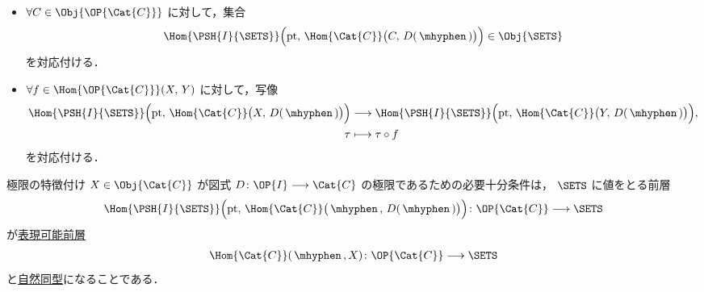 \documentclass[TQFT_main]{subfiles}
\begin{document}
\begin{itemize}
    \item $\forall C \in \Obj{\OP{\Cat{C}}}$ に対して，集合
    \begin{align}
        \Hom{\PSH{I}{\SETS}} \Bigl( \mathrm{pt},\, \Hom{\Cat{C}}\bigl(C,\, D(\, \mhyphen \,) \bigr)  \Bigr) \in \Obj{\SETS}
    \end{align}
    を対応付ける．
    \item $\forall f \in \Hom{\OP{\Cat{C}}} (X,\, Y)$ に対して，写像
    \begin{align}
        \Hom{\PSH{I}{\SETS}} \Bigl( \mathrm{pt},\, \Hom{\Cat{C}}\bigl(X,\, D(\, \mhyphen \,) \bigr)  \Bigr) &\lto \Hom{\PSH{I}{\SETS}} \Bigl( \mathrm{pt},\, \Hom{\Cat{C}}\bigl(Y,\, D(\, \mhyphen \,) \bigr)  \Bigr), \\
        \tau &\lmto \tau \circ f
    \end{align}
    を対応付ける．
\end{itemize}

\begin{myprop}[label=prop:redef-lim]{極限の特徴付け}
    $X \in \Obj{\Cat{C}}$ が図式 $D \colon \OP{I} \lto \Cat{C}$ の極限であるための必要十分条件は，
    $\SETS$ に値をとる前層
    \begin{align}
        \Hom{\PSH{I}{\SETS}} \Bigl( \mathrm{pt},\, \Hom{\Cat{C}}\bigl(\, \mhyphen \,,\, D(\, \mhyphen \,) \bigr)  \Bigr) \colon \OP{\Cat{C}} \lto \SETS
    \end{align}
    が\hyperref[def:representable]{表現可能前層}
    \begin{align}
        \Hom{\Cat{C}}(\, \mhyphen \,, X) \colon \OP{\Cat{C}} \lto \SETS
    \end{align}
    と\hyperref[def:nat]{自然同型}になることである．
\end{myprop}
\end{document}
